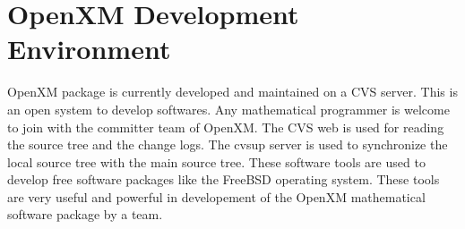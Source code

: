 
\section{OpenXM Development Environment}  

OpenXM package is currently developed and maintained on
a CVS server.
This is an open system to develop softwares.
Any mathematical programmer is welcome to
join with the committer team of OpenXM.
The CVS web is used for reading the source tree and the change logs.
The cvsup server is used to synchronize the local source tree with
the main source tree.
These software tools are used to develop free software packages
like the FreeBSD operating system.
These tools are very useful and powerful in developement
of the OpenXM mathematical software package by a team.
